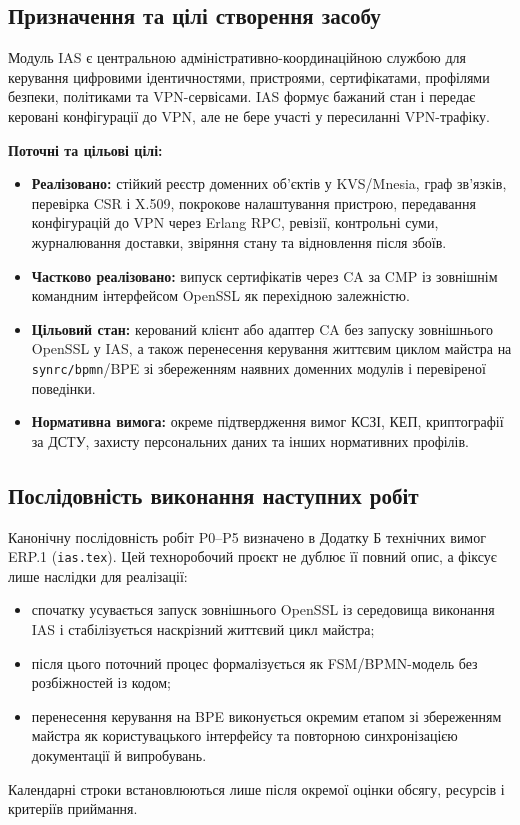 \documentclass{article}
\begin{document}
\subsection{Призначення та цілі створення засобу}
Модуль IAS є центральною адміністративно-координаційною службою для керування цифровими ідентичностями, пристроями, сертифікатами, профілями безпеки, політиками та VPN-сервісами. IAS формує бажаний стан і передає керовані конфігурації до VPN, але не бере участі у пересиланні VPN-трафіку.

\textbf{Поточні та цільові цілі:}
\begin{itemize}
    \item \textbf{Реалізовано:} стійкий реєстр доменних об'єктів у KVS/Mnesia, граф зв'язків, перевірка CSR і X.509, покрокове налаштування пристрою, передавання конфігурацій до VPN через Erlang RPC, ревізії, контрольні суми, журналювання доставки, звіряння стану та відновлення після збоїв.
    \item \textbf{Частково реалізовано:} випуск сертифікатів через CA за CMP із зовнішнім командним інтерфейсом OpenSSL як перехідною залежністю.
    \item \textbf{Цільовий стан:} керований клієнт або адаптер CA без запуску зовнішнього OpenSSL у IAS, а також перенесення керування життєвим циклом майстра на \texttt{synrc/bpmn}/BPE зі збереженням наявних доменних модулів і перевіреної поведінки.
    \item \textbf{Нормативна вимога:} окреме підтвердження вимог КСЗІ, КЕП, криптографії за ДСТУ, захисту персональних даних та інших нормативних профілів.
\end{itemize}

\subsection{Послідовність виконання наступних робіт}
Канонічну послідовність робіт P0--P5 визначено в Додатку Б технічних вимог ERP.1 (\texttt{ias.tex}). Цей техноробочий проєкт не дублює її повний опис, а фіксує лише наслідки для реалізації:
\begin{itemize}
    \item спочатку усувається запуск зовнішнього OpenSSL із середовища виконання IAS і стабілізується наскрізний життєвий цикл майстра;
    \item після цього поточний процес формалізується як FSM/BPMN-модель без розбіжностей із кодом;
    \item перенесення керування на BPE виконується окремим етапом зі збереженням майстра як користувацького інтерфейсу та повторною синхронізацією документації й випробувань.
\end{itemize}
Календарні строки встановлюються лише після окремої оцінки обсягу, ресурсів і критеріїв приймання.
\end{document}
